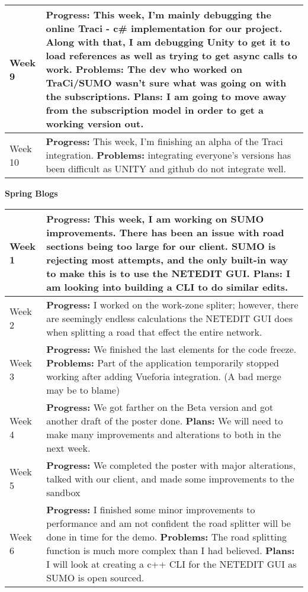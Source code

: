 \documentclass[letterpaper, 10pt, onecolumn, draftclsnofoot]{IEEEtran}
\begin{document}
\begin{center}
\begin{longtable}{|p{4cm}|p{10cm}|}
            \hline
            Week 9 & \textbf{Progress:} This week, I'm mainly debugging the online Traci - c\# implementation for our project. Along with that, I am debugging Unity to get it to load references as well as trying to get async calls to work.  \textbf{Problems:} The dev who worked on TraCi/SUMO wasn't sure what was going on with the subscriptions. \textbf{Plans:} I am going to move away from the subscription model in order to get a working version out. \\
            \hline
            Week 10 & \textbf{Progress:} This week, I'm finishing an alpha of the Traci integration.  \textbf{Problems:} integrating everyone's versions has been difficult as UNITY and github do not integrate well. \\
            \hline
        \end{longtable}
        \end{center}
        
        \begin{center}
        \large{\textbf{Spring Blogs}} \\
        \begin{longtable}{|p{4cm}|p{10cm}|}
            \hline
            Week 1 & \textbf{Progress:} This week, I am working on SUMO improvements. There has been an issue with road sections being too large for our client. SUMO is rejecting most attempts, and the only built-in way to make this is to use the NETEDIT GUI. \textbf{Plans:} I am looking into building a CLI to do similar edits.\\
            \hline
            Week 2 & \textbf{Progress:} I worked on the work-zone spliter; however, there are seemingly endless calculations the NETEDIT GUI does when splitting a road that effect the entire network. \\
            \hline
            Week 3 & \textbf{Progress:} We finished the last elements for the code freeze. \textbf{Problems:} Part of the application temporarily stopped working after adding Vueforia integration. (A bad merge may be to blame) \\
            \hline
            Week 4 & \textbf{Progress:} We got farther on the Beta version and got another draft of the poster done. \textbf{Plans: } We will need to make many improvements and alterations to both in the next week. \\
            \hline
            Week 5 & \textbf{Progress:} We completed the poster with major alterations, talked with our client, and made some improvements to the sandbox \\
            \hline
            Week 6 & \textbf{Progress:} I finished some minor improvements to performance and am not confident the road splitter will be done in time for the demo. \textbf{Problems:} The road splitting function is much more complex than I had believed. \textbf{Plans:} I will look at creating a c++ CLI for the NETEDIT GUI as SUMO is open sourced. \\
            \hline
        \end{longtable}
        \end{center}
    
\end{document}
